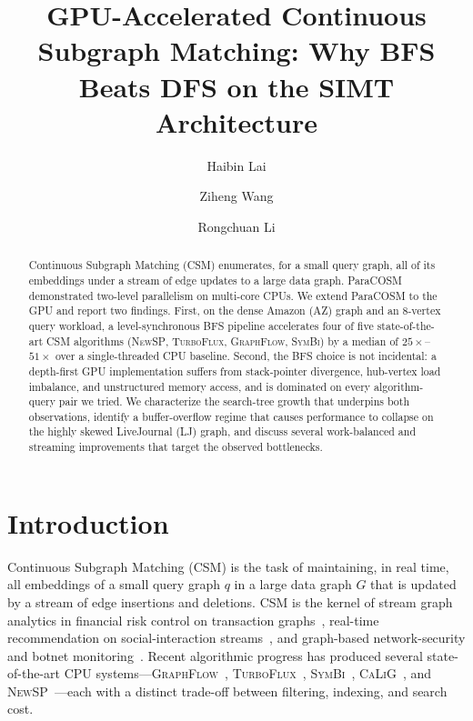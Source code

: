 \documentclass[sigconf,nonacm]{acmart}
\title[GPU-Accelerated Continuous Subgraph Matching]{GPU-Accelerated Continuous Subgraph Matching: Why BFS Beats DFS on the SIMT Architecture}
\author{Haibin Lai}
\affiliation{%
  \institution{Southern University of Science and Technology}
  \city{Shenzhen}
  \country{China}
}
\author{Ziheng Wang}
\affiliation{%
  \institution{Southern University of Science and Technology}
  \city{Shenzhen}
  \country{China}
}
\author{Rongchuan Li}
\affiliation{%
  \institution{Southern University of Science and Technology}
  \city{Shenzhen}
  \country{China}
}
\theoremstyle{definition}
\begin{document}
\begin{abstract}
Continuous Subgraph Matching (CSM) enumerates, for a small query graph, all of its embeddings under a stream of edge updates to a large data graph. ParaCOSM~\cite{paracosm2025} demonstrated two-level parallelism on multi-core CPUs. We extend ParaCOSM to the GPU and report two findings. First, on the dense Amazon (AZ) graph and an 8-vertex query workload, a level-synchronous BFS pipeline accelerates four of five state-of-the-art CSM algorithms (\textsc{NewSP}, \textsc{TurboFlux}, \textsc{GraphFlow}, \textsc{SymBi}) by a median of $25\times$--$51\times$ over a single-threaded CPU baseline. Second, the BFS choice is not incidental: a depth-first GPU implementation suffers from stack-pointer divergence, hub-vertex load imbalance, and unstructured memory access, and is dominated on every algorithm-query pair we tried. We characterize the search-tree growth that underpins both observations, identify a buffer-overflow regime that causes performance to collapse on the highly skewed LiveJournal (LJ) graph, and discuss several work-balanced and streaming improvements that target the observed bottlenecks.
\end{abstract}


\maketitle

\section{Introduction}
Continuous Subgraph Matching (CSM) is the task of maintaining, in real time, all embeddings of a small query graph $q$ in a large data graph $G$ that is updated by a stream of edge insertions and deletions. CSM is the kernel of stream graph analytics in financial risk control on transaction graphs~\cite{zhang2024bg3}, real-time recommendation on social-interaction streams~\cite{gupta2014twitter}, and graph-based network-security and botnet monitoring~\cite{lagraa2024network}. Recent algorithmic progress has produced several state-of-the-art CPU systems---\textsc{GraphFlow}~\cite{graphflow}, \textsc{TurboFlux}~\cite{turboflux}, \textsc{SymBi}~\cite{rapids-symbi}, \textsc{CaLiG}~\cite{calig}, and \textsc{NewSP}~\cite{newsp}---each with a distinct trade-off between filtering, indexing, and search cost.
\end{document}
